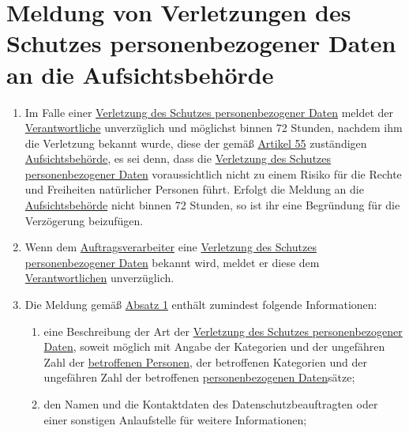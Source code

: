 \chapter{Meldung von Verletzungen des Schutzes personenbezogener Daten an die Aufsichtsbehörde}
\label{ch:33}


\begin{enumerate}

  \item Im Falle einer \hyperref[itm:04-12]{Verletzung des Schutzes personenbezogener Daten} meldet der \hyperref
   [itm:04-7]{Verantwortliche} unverzüglich und möglichst binnen 72 Stunden, nachdem ihm die
   Verletzung bekannt wurde, diese der gemäß \hyperref[ch:55]{Artikel 55} zuständigen \hyperref[itm:04-21]
   {Aufsichtsbehörde}, es sei denn, dass die \hyperref[itm:04-12]{Verletzung des Schutzes personenbezogener Daten}
   voraussichtlich nicht zu einem Risiko für die Rechte und Freiheiten natürlicher Personen führt. Erfolgt die Meldung
   an die \hyperref[itm:04-21]{Aufsichtsbehörde} nicht binnen 72 Stunden, so ist ihr eine Begründung für die
   Verzögerung beizufügen.%
  \label{itm:33-1}

  \item Wenn dem \hyperref[itm:04-8]{Auftragsverarbeiter} eine \hyperref[itm:04-12]{Verletzung des Schutzes
   personenbezogener Daten} bekannt wird, meldet er diese dem \hyperref[itm:04-7]{Verantwortlichen} unverzüglich.%
  \label{itm:33-2}

  \item Die Meldung gemäß \hyperref[itm:33-1]{Absatz 1} enthält zumindest folgende Informationen:%
  \label{itm:33-3}

  \begin{enumerate}
  
    \item eine Beschreibung der Art der \hyperref[itm:04-12]{Verletzung des Schutzes personenbezogener Daten}, soweit
     möglich mit Angabe der Kategorien und der ungefähren Zahl der \hyperref[itm:04-1]{betroffenen Personen}, der
     betroffenen Kategorien und der ungefähren Zahl der betroffenen \hyperref[itm:04-1]{personenbezogenen Daten}sätze;%
    \label{itm:33-3a}

    \item den Namen und die Kontaktdaten des Datenschutzbeauftragten oder einer sonstigen Anlaufstelle für weitere
     Informationen;%
    \label{itm:33-3b}


\end{enumerate}
\end{enumerate}
